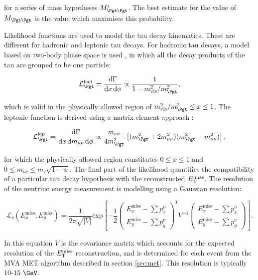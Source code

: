 for a series of mass hypotheses $M_{\Pgt\Pgt}^{i}$. The best estimate for the
value of $M_{\Pgt\Pgt}$ is the value which maximises this probability. 

Likelihood functions are used to model the tau decay kinematics. These are
different for hadronic and leptonic tau decays. For hadronic tau decays, a model
based on two-body phase space is used \cite{PDG}, in which all the decay products of the
tau are grouped to be one particle:

\begin{equation}
\mathcal{L}_{\Pgt}^{\text{had}} = \frac{\text{d}\Gamma}{\text{d}x\,\text{d}\phi}
\propto \frac{1}{1 - m_{\text{vis}}^{2} / m_{\Pgt}^{2}},
\end{equation}

which is valid in the physically allowed region of $m_{\text{vis}}^{2} /
m_{\Pgt}^{2} \leq x \leq 1$. The leptonic function is derived using a matrix
element approach \cite{TauPol}:

\begin{equation}
\mathcal{L}_{\Pgt}^{\text{lep}} =
\frac{\text{d}\Gamma}{\text{d}x\,\text{d}m_{\nu\nu}\,\text{d}\phi} \propto
\frac{m_{\nu\nu}}{4m_{\Pgt}^{2}}\left[(m_{\Pgt}^{2}+2m_{\nu\nu}^{2})(m_{\Pgt}^{2}-m_{\nu\nu}^{2})\right],
\end{equation}

for which the physically allowed region constitutes $0 \leq x \leq 1$ and $0
\leq m_{\nu\nu} \leq m_{\tau}\sqrt{1-x}$. The final part of the likelihood
quantifies the compatibility of a particular tau decay hypothesis with the
reconstructed $E_{\mathrm{T}}^{\text{miss}}$. The resolution of the neutrino energy measurement is
modelling using a Gaussian resolution:

\begin{equation}
\mathcal{L}_{\nu}(E_{x}^{\text{miss}},E_{y}^{\text{miss}}) =
\frac{1}{2\pi\sqrt{|V|}}\text{exp}\left[
-\frac{1}{2}\begin{pmatrix}E_{x}^{\text{miss}}-\sum p_{x}^{\nu} \\
E_{y}^{\text{miss}}-\sum p_{y}^{\nu}\end{pmatrix}^{T} V^{-1}
\begin{pmatrix}E_{x}^{\text{miss}}-\sum p_{x}^{\nu} \\ E_{y}^{\text{miss}}-\sum
p_{y}^{\nu}\end{pmatrix}\right].
\end{equation}

In this equation $V$ is the covariance matrix which accounts for the expected
resolution of the $E_{\mathrm{T}}^{\text{miss}}$ reconstruction, and is determined for each event from
the MVA MET algorithm described in section \ref{sec:met}. This resolution is
typically $10$-$15~\GeV$. 

